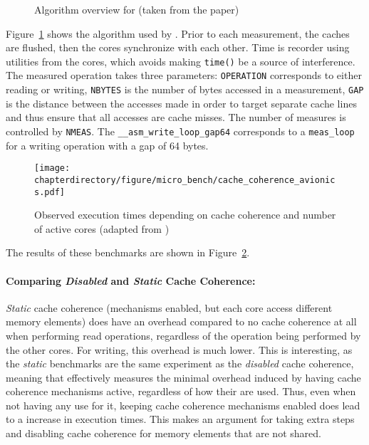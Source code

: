 \begin{figure}[hbt!]

\caption{%
Algorithm overview for \cite{Nowotsch2012LeveragingMC} (taken from the paper)
}
\label{fig:micro_bench:cache_coherence_avionics_algo}
\end{figure}

Figure~\ref{fig:micro_bench:cache_coherence_avionics_algo} shows the algorithm
used by \cite{10.1109/PACT.2009.22}. Prior to each measurement, the caches are
flushed, then the cores synchronize with each other. Time is recorder using
utilities from the cores, which avoids making \lstinline!time()! be a source of
interference. The measured operation takes three parameters:
\lstinline!OPERATION! corresponds to either reading or writing,
\lstinline!NBYTES! is the number of bytes accessed in a measurement,
\lstinline!GAP! is the distance between the accesses made in order to target
separate cache lines and thus ensure that all accesses are cache misses. The
number of measures is controlled by \lstinline!NMEAS!. The
\lstinline!__asm_write_loop_gap64! corresponds to a \lstinline!meas_loop! for
a writing operation with a gap of 64 bytes.

\begin{figure}[hbt!]
\begin{center}
\texttt{[image: \\chapterdirectory/figure/micro\_bench/cache\_coherence\_avionics.pdf]}
\end{center}
\caption{Observed execution times depending on cache coherence and number of
active cores (adapted from \cite{Nowotsch2012LeveragingMC})}%
\label{fig:micro_bench:cache_coherence_avionics}
\end{figure}

The results of these benchmarks are shown in
Figure~\ref{fig:micro_bench:cache_coherence_avionics}.
\paragraph{Comparing \textit{Disabled} and \textit{Static} Cache Coherence:}
\textit{Static} cache coherence (mechanisms enabled, but each core access
different memory elements) does have an overhead compared to no cache
coherence at all when performing read operations, regardless of the operation
being performed by the other cores. For writing, this overhead is much lower.
This is interesting, as the \textit{static} benchmarks are the same experiment
as the \textit{disabled} cache coherence, meaning that effectively measures the
minimal overhead induced by having cache coherence mechanisms active,
regardless of how their are used. Thus, even when not having any use for it,
keeping cache coherence mechanisms enabled does lead to a increase in execution times.
This makes an argument for taking extra steps and disabling cache coherence for
memory elements that are not shared.

